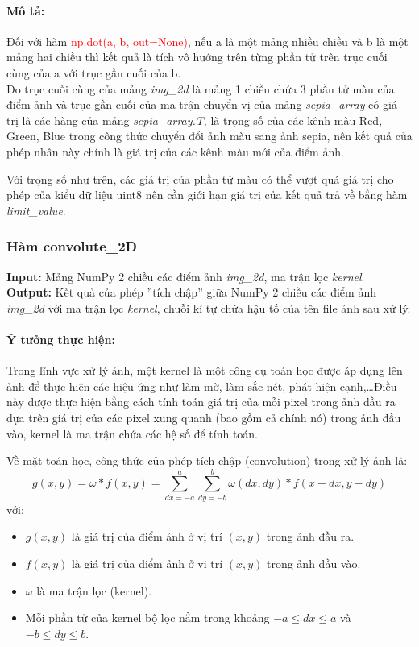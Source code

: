\documentclass[]{article}
\begin{document}
\paragraph{Mô tả:}
Đối với hàm \textcolor{red}{np.dot(a, b, out=None)}, nếu a là một mảng nhiều chiều và b là một mảng hai chiều thì kết quả là tích vô hướng trên từng phần tử trên trục cuối cùng của a với trục gần cuối của b.\\
Do trục cuối cùng của mảng \textit{img\_2d} là mảng 1 chiều chứa 3 phần tử màu của điểm ảnh và trục gần cuối của ma trận chuyển vị của mảng \textit{sepia\_array} có giá trị là các hàng của mảng \textit{sepia\_array.T}, là trọng số của các kênh màu Red, Green, Blue trong công thức chuyển đổi ảnh màu sang ảnh sepia, nên kết quả của phép nhân này chính là giá trị của các kênh màu mới của điểm ảnh. \par
Với trọng số như trên, các giá trị của phần tử màu có thể vượt quá giá trị cho phép của kiểu dữ liệu uint8 nên cần giới hạn giá trị của kết quả trả về bằng hàm \textit{limit\_value}.

\subsubsection{Hàm convolute\_2D}
\textbf{Input:} Mảng NumPy 2 chiều các điểm ảnh \textit{img\_2d}, ma trận lọc \textit{kernel}. \\
\textbf{Output:} Kết quả của phép ''tích chập'' giữa NumPy 2 chiều các điểm ảnh \textit{img\_2d} với ma trận lọc \textit{kernel}, chuỗi kí tự chứa hậu tố của tên file ảnh sau xử lý. \\
\paragraph{Ý tưởng thực hiện:} Trong lĩnh vực xử lý ảnh, một kernel là một công cụ toán học được áp dụng lên ảnh để thực hiện các hiệu ứng như làm mờ, làm sắc nét, phát hiện cạnh,\dots Điều này được thực hiện bằng cách tính toán giá trị của mỗi pixel trong ảnh đầu ra dựa trên giá trị của các pixel xung quanh (bao gồm cả chính nó) trong ảnh đầu vào, kernel là ma trận chứa các hệ số để tính toán. \par
Về mặt toán học, công thức của phép tích chập (convolution) trong xử lý ảnh là:
\[ g(x, y) = \omega * f(x, y) = \sum_{dx=-a}^{a} \sum_{dy=-b}^{b} \omega (dx, dy) * f(x-dx, y-dy) \]
với:
\begin{itemize}
  \item $g(x, y)$ là giá trị của điểm ảnh ở vị trí $(x, y)$ trong ảnh đầu ra.
  \item $f(x, y)$ là giá trị của điểm ảnh ở vị trí $(x, y)$ trong ảnh đầu vào.
  \item $\omega$ là ma trận lọc (kernel).
  \item Mỗi phần tử của kernel bộ lọc nằm trong khoảng $-a \leq dx \leq a$ và $-b \leq dy \leq b$.
\end{itemize}
\end{document}
